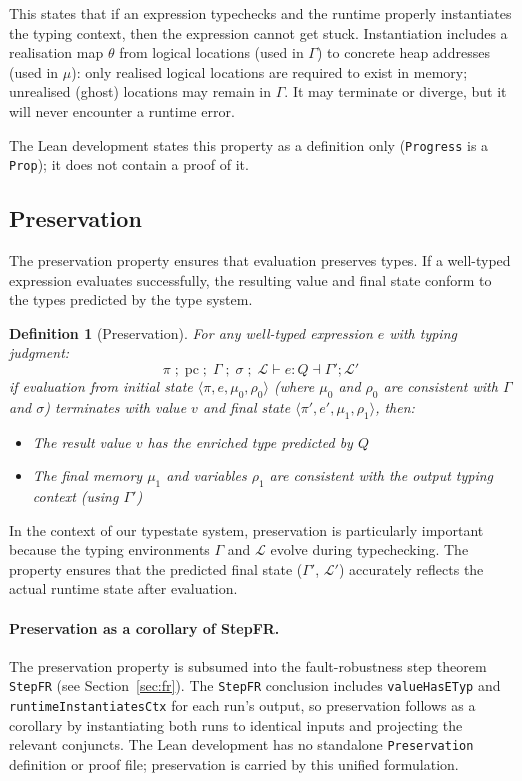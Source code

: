 \documentclass[12pt]{article}
\newtheorem{definition}{Definition}[section]
\begin{document}
This states that if an expression typechecks and the runtime properly instantiates
the typing context, then the expression cannot get stuck. Instantiation
includes a realisation map $\theta$ from logical locations (used in $\Gamma$) to
concrete heap addresses (used in $\mu$): only realised logical locations are
required to exist in memory; unrealised (ghost) locations may remain in
$\Gamma$. It may terminate or diverge, but it will never encounter a runtime
error.

The Lean development states this property as a definition only
(\texttt{Progress} is a \texttt{Prop}); it does not contain a proof of it.

\subsection{Preservation}

The preservation property ensures that evaluation preserves types. If a
well-typed expression evaluates successfully, the resulting value and final
state conform to the types predicted by the type system.

\begin{definition}[Preservation]
For any well-typed expression $e$ with typing judgment:
\[
\pi \; ;\; \text{pc} \; ;\; \Gamma \; ;\; \sigma \; ;\; \mathcal{L} \vdash e : Q \dashv \Gamma' ; \mathcal{L}'
\]
if evaluation from initial state $\langle \pi, e, \mu_0, \rho_0 \rangle$ (where
$\mu_0$ and $\rho_0$ are consistent with $\Gamma$ and $\sigma$) terminates with
value $v$ and final state $\langle \pi', e', \mu_1, \rho_1 \rangle$, then:
\begin{itemize}
    \item The result value $v$ has the enriched type predicted by $Q$
    \item The final memory $\mu_1$ and variables $\rho_1$ are consistent with the output typing context (using $\Gamma'$)
\end{itemize}
\end{definition}

In the context of our typestate system, preservation is particularly important
because the typing environments $\Gamma$ and $\mathcal{L}$ evolve during
typechecking. The property ensures that the predicted final state ($\Gamma'$,
$\mathcal{L}'$) accurately reflects the actual runtime state after evaluation.

\paragraph{Preservation as a corollary of StepFR.} The preservation property is
subsumed into the fault-robustness step theorem \texttt{StepFR} (see
Section~\ref{sec:fr}). The \texttt{StepFR} conclusion includes
\texttt{valueHasETyp} and \texttt{runtimeInstantiatesCtx} for each run's output,
so preservation follows as a corollary by instantiating both runs to identical
inputs and projecting the relevant conjuncts. The Lean development has no
standalone \texttt{Preservation} definition or proof file; preservation is
carried by this unified formulation.
\end{document}
